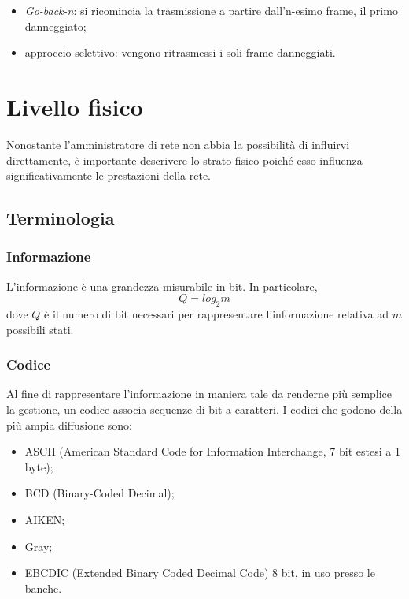 \documentclass[a4paper,11pt]{article}
\def\sec#1{\section{#1}\label{#1}}
\def\subsub#1{\subsubsection{#1}\label{#1}}
\begin{document}
\begin{itemize}
\item \textit{Go-back-n}: si ricomincia la trasmissione a partire dall'n-esimo frame, il primo danneggiato;
\item approccio selettivo: vengono ritrasmessi i soli frame danneggiati.
\end{itemize}
\newpage\sec{Livello fisico}
Nonostante l'amministratore di rete non abbia la possibilità di influirvi direttamente, è importante descrivere lo strato fisico poiché esso influenza significativamente le prestazioni della rete.

\subsection{Terminologia}
\subsub{Informazione} 
L'informazione è una grandezza misurabile in bit. In particolare, \[Q=log_{2}m\] dove $Q$ è il numero di bit necessari per rappresentare l'informazione relativa ad $m$ possibili stati.

\subsub{Codice}
Al fine di rappresentare l'informazione in maniera tale da renderne più semplice la gestione, un codice associa sequenze di bit a caratteri. I codici che godono della più ampia diffusione sono:
\begin{itemize}
\item ASCII (American Standard Code for Information Interchange, 7 bit estesi a 1 byte);
\item BCD (Binary-Coded Decimal);
\item AIKEN;
\item Gray;
\item EBCDIC (Extended Binary Coded Decimal Code) 8 bit, in uso presso le banche.
\end{itemize}
\end{document}
